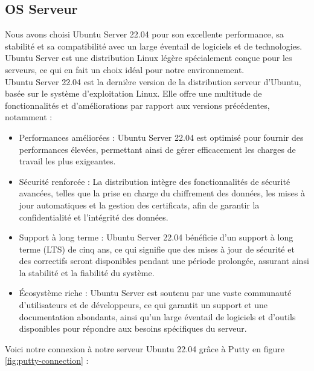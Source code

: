\subsection{OS Serveur}
Nous avons choisi Ubuntu Server 22.04 pour son excellente performance, sa stabilité et sa compatibilité avec un large éventail de logiciels et de technologies. Ubuntu Server est une distribution Linux légère spécialement conçue pour les serveurs, ce qui en fait un choix idéal pour notre environnement. \\


Ubuntu Server 22.04 est la dernière version de la distribution serveur d'Ubuntu, basée sur le système d'exploitation Linux. Elle offre une multitude de fonctionnalités et d'améliorations par rapport aux versions précédentes, notamment : \\

\begin{itemize}
  
\item Performances améliorées : Ubuntu Server 22.04 est optimisé pour fournir des performances élevées, permettant ainsi de gérer efficacement les charges de travail les plus exigeantes.

\item Sécurité renforcée : La distribution intègre des fonctionnalités de sécurité avancées, telles que la prise en charge du chiffrement des données, les mises à jour automatiques et la gestion des certificats, afin de garantir la confidentialité et l'intégrité des données.

\item Support à long terme : Ubuntu Server 22.04 bénéficie d'un support à long terme (LTS) de cinq ans, ce qui signifie que des mises à jour de sécurité et des correctifs seront disponibles pendant une période prolongée, assurant ainsi la stabilité et la fiabilité du système.

\item Écosystème riche : Ubuntu Server est soutenu par une vaste communauté d'utilisateurs et de développeurs, ce qui garantit un support et une documentation abondants, ainsi qu'un large éventail de logiciels et d'outils disponibles pour répondre aux besoins spécifiques du serveur.
\end{itemize}



Voici notre connexion à notre serveur Ubuntu 22.04 grâce à Putty en figure \ref{fig:putty-connection} : \\

